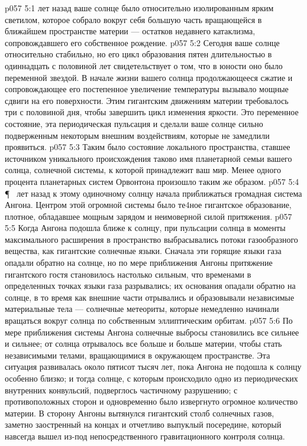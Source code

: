 \vs p057 5:1  лет назад ваше солнце было относительно изолированным ярким светилом, которое собрало вокруг себя большую часть вращающейся в ближайшем пространстве материи --- остатков недавнего катаклизма, сопровождавшего его собственное рождение.
\vs p057 5:2 Сегодня ваше солнце относительно стабильно, но его цикл образования пятен длительностью в одиннадцать с половиной лет свидетельствует о том, что в юности оно было переменной звездой. В начале жизни вашего солнца продолжающееся сжатие и сопровождающее его постепенное увеличение температуры вызывало мощные сдвиги на его поверхности. Этим гигантским движениям материи требовалось три с половиной дня, чтобы завершить цикл изменения яркости. Это переменное состояние, эта периодическая пульсация и сделали ваше солнце сильно подверженным некоторым внешним воздействиям, которые не замедлили проявиться.
\vs p057 5:3 Таким было состояние локального пространства, ставшее источником уникального происхождения  таково имя планетарной семьи вашего солнца, солнечной системы, к которой принадлежит ваш мир. Менее одного процента планетарных систем Орвонтона произошло таким же образом.
\vs p057 5:4 \P\  лет назад к этому одиночному солнцу начала приближаться громадная система Ангона. Центром этой огромной системы было те4ное гигантское образование, плотное, обладавшее мощным зарядом и неимоверной силой притяжения.
\vs p057 5:5 Когда Ангона подошла ближе к солнцу, при пульсации солнца в моменты максимального расширения в пространство выбрасывались потоки газообразного вещества, как гигантские солнечные языки. Сначала эти горящие языки газа опадали обратно на солнце, но по мере приближения Ангоны притяжение гигантского гостя становилось настолько сильным, что временами в определенных точках языки газа разрывались; их основания опадали обратно на солнце, в то время как внешние части отрывались и образовывали независимые материальные тела --- солнечные метеориты, которые немедленно начинали вращаться вокруг солнца по собственным эллиптическим орбитам.
\vs p057 5:6 По мере приближения системы Ангона солнечные выбросы становились все сильнее и сильнее; от солнца отрывалось все больше и больше материи, чтобы стать независимыми телами, вращающимися в окружающем пространстве. Эта ситуация развивалась около пятисот тысяч лет, пока Ангона не подошла к солнцу особенно близко; и тогда солнце, с которым происходило одно из периодических внутренних конвульсий, подверглось частичному разрушению; с противоположных сторон и одновременно было извергнуто огромное количество материи. В сторону Ангоны вытянулся гигантский столб солнечных газов, заметно заостренный на концах и отчетливо выпуклый посередине, который навсегда вышел из\hyp{}под непосредственного гравитационного контроля солнца.
